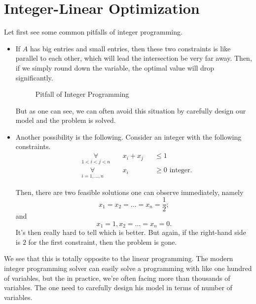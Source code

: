\chapter{Integer-Linear Optimization}
Let first see some common pitfalls of integer programming.

\begin{itemize}
	\item If \(A \) has big entries and small entries, then these two constraints is like parallel to each other,
	      which will lead the intersection be very far away. Then, if we simply round down the variable, the optimal value will drop significantly.
	      \begin{figure}[H]
		      \centering
		      \caption{Pitfall of Integer Programming}
		      \label{fig:integer-programming-pitfall}
	      \end{figure}

	      But as one can see, we can often avoid this situation by carefully design our model and the problem is solved.
	\item Another possibility is the following. Consider an integer with the following constraints.
	      \[
		      \begin{alignedat}{3}
			      & \underset{1 < i < j < n}{\forall}\      &  & x_{i}+x_{j} &  & \leq 1                  \\
			      & \underset{i = 1, \ldots , n}{\forall}\  &  & x_{i}       &  & \geq 0 \text{ integer}.
		      \end{alignedat}
	      \]

	      Then, there are two feasible solutions one can observe immediately, namely
	      \[
		      x_1 = x_2 = \ldots = x_{n} = \frac{1}{2};
	      \]
	      and
	      \[
		      x_1 = 1, x_2 = \ldots = x_{n} = 0.
	      \]
	      It's then really hard to tell which is better. But again, if the right-hand side is \(2\) for the first constraint, then the problem
	      is gone.
\end{itemize}

\begin{note}
	We see that this is totally opposite to the linear programming. The modern integer programming solver can easily solve a programming with
	like one hundred of variables, but the in practice, we're often facing more than thousands of variables. The one need to carefully design
	his model in terms of number of variables.
\end{note}

